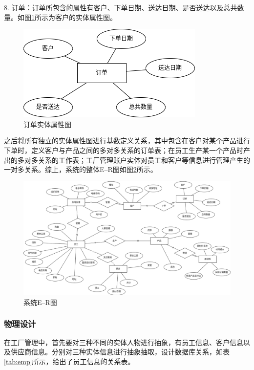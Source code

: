 8. 订单：订单所包含的属性有客户、下单日期、送达日期、是否送达以及总共数量。如图\ref{fig:4oderf}所示为客户的实体属性图。

\begin{figure}[H]
    \centering
    \includegraphics[width=.45\textwidth]{figures/4oderf.png}
    \caption{订单实体属性图}
    \label{fig:4oderf}
\end{figure}

之后将所有独立的实体属性图进行基数定义关系，其中包含在客户对某个产品进行下单时，定义客户与产品之间的多对多关系的订单表；在员工生产某一个产品时产出的多对多关系的工作表；工厂管理账户实体对员工和客户等信息进行管理产生的一对多关系。综上，系统的整体E--R图如图\ref{fig:4totalerf}所示。

\begin{figure}[H]
    \centering
    \includegraphics[width=\textwidth]{figures/4totalerf.png}
    \caption{系统E--R图}
    \label{fig:4totalerf}
\end{figure}

\subsubsection{物理设计}

在工厂管理中，首先要对三种不同的实体人物进行抽象，有员工信息、客户信息以及供应商信息。分别对三种实体信息进行抽象抽取，设计数据库关系，如表\ref{tab:emp}所示，给出了员工信息的关系表。

